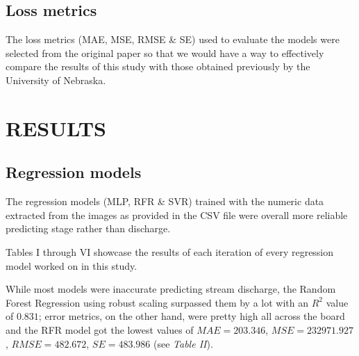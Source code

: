 \documentclass[conference]{IEEEtran}
\begin{document}
\subsection{\textbf{Loss metrics}}
The loss metrics (MAE, MSE, RMSE \& SE) used to evaluate the models were selected from the original paper so that we would have a way to effectively compare the results of this study with those obtained previously by the University of Nebraska.

\section{RESULTS}
\subsection{\textbf{Regression models}}
The regression models (MLP, RFR \& SVR) trained with the numeric data extracted from the images as provided in the CSV file were overall more reliable predicting stage rather than discharge.

Tables I through VI showcase the results of each iteration of every regression model worked on in this study.

While most models were inaccurate predicting stream discharge, the Random Forest Regression using robust scaling surpassed them by a lot with an $R^2$ value of $0.831$; error metrics, on the other hand, were pretty high all across the board and the RFR model got the lowest values of $MAE = 203.346$, $MSE = 232971.927$, $RMSE = 482.672$, $SE = 483.986$ (see \textit{Table II}).
\end{document}
